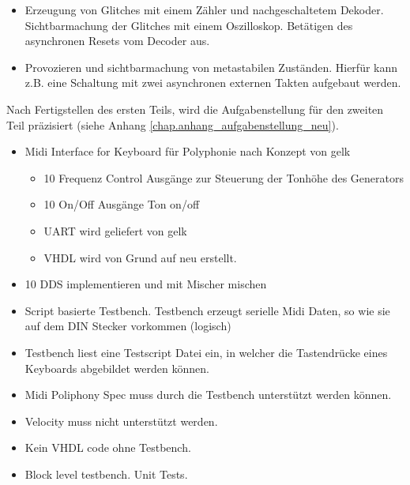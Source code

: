 \begin{itemize}
	\item Erzeugung von Glitches mit einem Zähler und nachgeschaltetem Dekoder. Sichtbarmachung der Glitches mit einem Oszilloskop. Betätigen des asynchronen Resets vom Decoder aus.

	\item Provozieren und sichtbarmachung von metastabilen Zuständen. Hierfür kann z.B. eine Schaltung mit zwei asynchronen externen Takten aufgebaut werden.
\end{itemize}  


Nach Fertigstellen des ersten Teils, wird die Aufgabenstellung für den zweiten Teil präzisiert (siehe Anhang \ref{chap.anhang_aufgabenstellung_neu}).

\begin{itemize}
\item Midi Interface for Keyboard für Polyphonie nach Konzept von gelk
\begin{itemize}
    \item 10 Frequenz Control Ausgänge zur Steuerung der Tonhöhe des Generators
    \item 10 On/Off Ausgänge Ton on/off
    \item UART wird geliefert von gelk
    \item VHDL wird von Grund auf neu erstellt.
\end{itemize}
\item 10 DDS implementieren und mit Mischer mischen
\item Script basierte Testbench. Testbench erzeugt serielle Midi Daten, so wie sie auf dem DIN Stecker vorkommen (logisch)
\item Testbench liest eine Testscript Datei ein, in welcher die Tastendrücke eines Keyboards abgebildet werden können. 
\item Midi Poliphony Spec muss durch die Testbench unterstützt werden können. 
\item Velocity muss nicht unterstützt werden.
\item Kein VHDL code ohne Testbench.
\item Block level testbench. Unit Tests.
\end{itemize}
